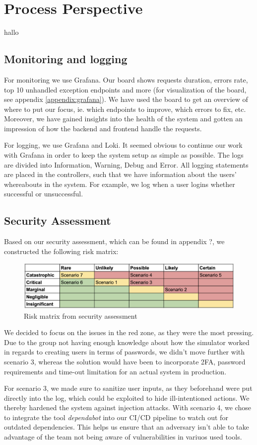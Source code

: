 \section{Process Perspective}
hallo \cite{devopshandbook}
\subsection{Monitoring and logging}
For monitoring we use Grafana. Our board shows requests duration, errors rate, top 10 unhandled exception endpoints and more (for visualization of the board, see appendix \ref{appendix:grafana}). We have used the board to get an overview of where to put our focus, ie. which endpoints to improve, which errors to fix, etc. Moreover, we have gained insights into the health of the system and gotten an impression of how the backend and frontend handle the requests.

For logging, we use Grafana and Loki. It seemed obvious to continue our work with Grafana in order to keep the system setup as simple as possible. The logs are divided into Information, Warning, Debug and Error. All logging statements are placed in the controllers, such that we have information about the users' whereabouts in the system. For example, we log when a user logins whether successful or unsuccessful.
\subsection{Security Assessment}
Based on our security assessment, which can be found in appendix ?, we constructed the following risk matrix:
\begin{figure}[H]
    \centering
    \includegraphics[width=0.7\linewidth]{images/risk-matrix.png}
    \caption{Risk matrix from security assessment}
    \label{fig:enter-label}
\end{figure}
We decided to focus on the issues in the red zone, as they were the most pressing. Due to the group not having enough knowledge about how the simulator worked in regards to creating users in terms of passwords, we didn't move further with scenario 3, whereas the solution would have been to incorporate 2FA, password requirements and time-out limitation for an actual system in production.

For scenario 3, we made sure to sanitize user inputs, as they beforehand were put directly into the log, which could be exploited to hide ill-intentioned actions. We thereby hardened the system against injection attacks.
With scenario 4, we chose to integrate the tool \textit{dependabot} into our CI/CD pipeline to watch out for outdated dependencies. This helps us ensure that an adversary isn't able to take advantage of the team not being aware of vulnerabilities in variuos used tools.

